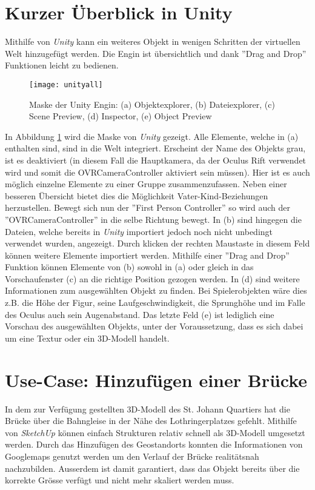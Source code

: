 \section{Kurzer Überblick in Unity}\label{s.unity}
Mithilfe von \textit{Unity} kann ein weiteres Objekt in wenigen Schritten der virtuellen Welt hinzugefügt werden. Die Engin ist übersichtlich und dank ''Drag and Drop'' Funktionen leicht zu bedienen.\\[6pt]
\begin{figure}[ht]
	\vspace{-20pt}
	\begin{center}
		\texttt{[image: unityall]}
	\end{center}
	\vspace{-15pt}
	\caption[Maske der Unity Engin]{Maske der Unity Engin: (a) Objektexplorer, (b) Dateiexplorer, (c) Scene Preview, (d) Inspector, (e) Object Preview}\label{unityall}
	\vspace{-12pt}
\end{figure}

 In Abbildung \ref{unityall} wird die Maske von \textit{Unity} gezeigt. Alle Elemente, welche in (a) enthalten sind, sind in die Welt integriert. Erscheint der Name des Objekts grau, ist es deaktiviert (in diesem Fall die Hauptkamera, da der Oculus Rift verwendet wird und somit die OVRCameraController aktiviert sein müssen). Hier ist es auch möglich einzelne Elemente zu einer Gruppe zusammenzufassen. Neben einer besseren Übersicht bietet dies die Möglichkeit Vater-Kind-Beziehungen herzustellen. Bewegt sich nun der ''First Person Controller'' so wird auch der ''OVRCameraController'' in die selbe Richtung bewegt. In (b) sind hingegen die Dateien, welche bereits in \textit{Unity} importiert jedoch noch nicht unbedingt verwendet wurden, angezeigt. Durch klicken der rechten Maustaste in diesem Feld können weitere Elemente importiert werden. Mithilfe einer ''Drag and Drop'' Funktion können Elemente von (b) sowohl in (a) oder gleich in das Vorschaufenster (c) an die richtige Position gezogen werden. In (d) sind weitere Informationen zum ausgewählten Objekt zu finden. Bei Spielerobjekten wäre dies z.B. die Höhe der Figur, seine Laufgeschwindigkeit, die Sprunghöhe und im Falle des Oculus auch sein Augenabstand. Das letzte Feld (e) ist lediglich eine Vorschau des ausgewählten Objekts, unter der Voraussetzung, dass es sich dabei um eine Textur oder ein 3D-Modell handelt.

\section{Use-Case: Hinzufügen einer Brücke}\label{s.brücke}
In dem zur Verfügung gestellten 3D-Modell des St. Johann Quartiers hat die Brücke über die Bahngleise in der Nähe des Lothringerplatzes gefehlt. Mithilfe von \textit{SketchUp} können einfach Strukturen relativ schnell als 3D-Modell umgesetzt werden. Durch das Hinzufügen des Geostandorts konnten die Informationen von Googlemaps genutzt werden um den Verlauf der Brücke realitätsnah nachzubilden. Ausserdem ist damit garantiert, dass das Objekt bereits über die korrekte Grösse verfügt und nicht mehr skaliert werden muss.\\[6pt]

